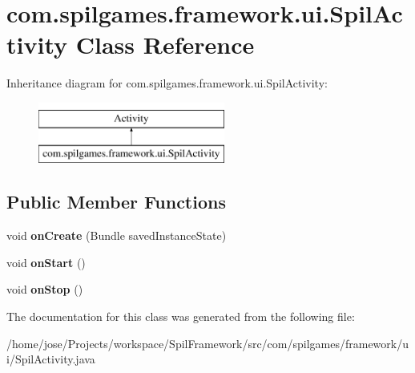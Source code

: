 \hypertarget{classcom_1_1spilgames_1_1framework_1_1ui_1_1_spil_activity}{\section{com.\-spilgames.\-framework.\-ui.\-Spil\-Activity Class Reference}
\label{classcom_1_1spilgames_1_1framework_1_1ui_1_1_spil_activity}
}
Inheritance diagram for com.\-spilgames.\-framework.\-ui.\-Spil\-Activity\-:\begin{figure}[H]
\begin{center}
\leavevmode
\includegraphics[height=2.000000cm]{classcom_1_1spilgames_1_1framework_1_1ui_1_1_spil_activity}
\end{center}
\end{figure}
\subsection*{Public Member Functions}
\begin{DoxyCompactItemize}
\item 
\hypertarget{classcom_1_1spilgames_1_1framework_1_1ui_1_1_spil_activity_a46be5e6d315f0df3141e9d351cad673b}{void {\bfseries on\-Create} (Bundle saved\-Instance\-State)}\label{classcom_1_1spilgames_1_1framework_1_1ui_1_1_spil_activity_a46be5e6d315f0df3141e9d351cad673b}

\item 
\hypertarget{classcom_1_1spilgames_1_1framework_1_1ui_1_1_spil_activity_aa8aa6c91db32e4399d9896dc56b9ad6f}{void {\bfseries on\-Start} ()}\label{classcom_1_1spilgames_1_1framework_1_1ui_1_1_spil_activity_aa8aa6c91db32e4399d9896dc56b9ad6f}

\item 
\hypertarget{classcom_1_1spilgames_1_1framework_1_1ui_1_1_spil_activity_ae7e52f9148675054b762e2afd2ba8e89}{void {\bfseries on\-Stop} ()}\label{classcom_1_1spilgames_1_1framework_1_1ui_1_1_spil_activity_ae7e52f9148675054b762e2afd2ba8e89}

\end{DoxyCompactItemize}


The documentation for this class was generated from the following file\-:\begin{DoxyCompactItemize}
\item 
/home/jose/\-Projects/workspace/\-Spil\-Framework/src/com/spilgames/framework/ui/Spil\-Activity.\-java\end{DoxyCompactItemize}
